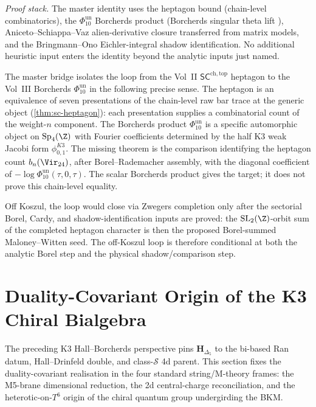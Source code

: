\begin{remark}
\emph{Proof stack.} The master identity uses the heptagon bound
(chain-level combinatorics), the $\Phi_{10}^{\mathrm{un}}$
Borcherds product (Borcherds singular theta lift
\cite{Borcherds1992}), Aniceto--Schiappa--Vaz alien-derivative
closure transferred from matrix models, and the Bringmann--Ono
Eichler-integral shadow identification. No additional heuristic input
enters the identity beyond the analytic inputs just named.
\end{remark}

\begin{remark}%
\label{rem:3dg-master-closes-loop}%
%
%
The master bridge isolates the loop from the Vol~II
$\mathsf{SC}^{\mathrm{ch,top}}$ heptagon to the Vol~III Borcherds
\(\Phi_{10}^{\mathrm{un}}\) in the following precise sense. The heptagon is an
equivalence of seven presentations of the chain-level raw bar trace
at the generic object
(\autoref{thm:sc-heptagon}): each presentation supplies a
combinatorial count of the weight-$n$ component. The Borcherds
product $\Phi_{10}^{\mathrm{un}}$ is a specific automorphic object on
$\mathrm{Sp}_{4}(\Z)$ with Fourier coefficients determined by the
half K3 weak Jacobi form $\phi_{0,1}^{K3}$. The missing theorem is the
comparison identifying the heptagon count
\(b_n(\Vir_{24})\), after Borel--Rademacher assembly, with the
diagonal coefficient of
\(-\log\Phi_{10}^{\mathrm{un}}(\tau,0,\tau)\). The scalar Borcherds
product gives the target; it does not prove this chain-level equality.

Off Koszul, the loop would close via Zwegers completion only after the
sectorial Borel, Cardy, and shadow-identification inputs are proved:
the \(\mathrm{SL}_{2}(\Z)\)-orbit sum of the completed heptagon
character is then the proposed Borel-summed Maloney--Witten seed. The
off-Koszul loop is therefore conditional at both the analytic Borel
step and the physical shadow/comparison step.
\end{remark}

\section{Duality-Covariant Origin of the K3 Chiral Bialgebra}
\label{sec:3dg-witten-supplement}

The preceding K3 Hall--Borcherds perspective pins
$\mathbf{H}_{\Delta_{5}}$ to the bi-based Ran datum, Hall--Drinfeld
double, and class-$\mathcal{S}$ 4d parent. This section fixes the
duality-covariant realisation in the four standard string/M-theory
frames: the M5-brane dimensional reduction, the 2d central-charge
reconciliation, and the heterotic-on-$T^{6}$ origin of the chiral
quantum group undergirding the BKM.


